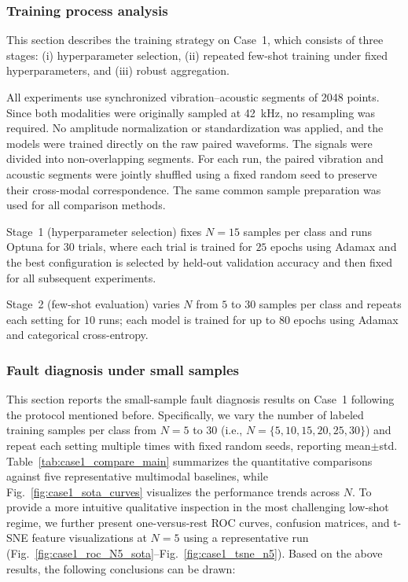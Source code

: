 \documentclass[a4paper]{cas-sc}
\begin{document}
\subsubsection{Training process analysis}
\label{subsubsec:training_process_case1}

This section describes the training strategy on Case~1, which consists of three stages: (i) hyperparameter selection, (ii) repeated few-shot training under fixed hyperparameters, and (iii) robust aggregation.

All experiments use synchronized vibration--acoustic segments of 2048 points. Since both modalities were originally sampled at 42~kHz, no resampling was required. No amplitude normalization or standardization was applied, and the models were trained directly on the raw paired waveforms. The signals were divided into non-overlapping segments. For each run, the paired vibration and acoustic segments were jointly shuffled using a fixed random seed to preserve their cross-modal correspondence. The same common sample preparation was used for all comparison methods.

Stage~1 (hyperparameter selection) fixes $N=15$ samples per class and runs Optuna for $30$ trials, where each trial is trained for $25$ epochs using Adamax and the best configuration is selected by held-out validation accuracy and then fixed for all subsequent experiments.

Stage~2 (few-shot evaluation) varies $N$ from $5$ to $30$ samples per class and repeats each setting for $10$ runs; each model is trained for up to $80$ epochs using Adamax and categorical cross-entropy.

\subsubsection{Fault diagnosis under small samples}

This section reports the small-sample fault diagnosis results on Case~1 following the protocol mentioned before. Specifically, we vary the number of labeled training samples per class from $N=5$ to $30$ (i.e., $N=\{5,10,15,20,25,30\}$) and repeat each setting multiple times with fixed random seeds, reporting mean$\pm$std. Table~\ref{tab:case1_compare_main} summarizes the quantitative comparisons against five representative multimodal baselines, while Fig.~\ref{fig:case1_sota_curves} visualizes the performance trends across $N$. To provide a more intuitive qualitative inspection in the most challenging low-shot regime, we further present one-versus-rest ROC curves, confusion matrices, and t-SNE feature visualizations at $N=5$ using a representative run (Fig.~\ref{fig:case1_roc_N5_sota}--Fig.~\ref{fig:case1_tsne_n5}). Based on the above results, the following conclusions can be drawn:
\end{document}
